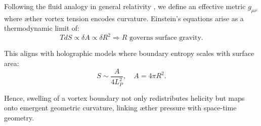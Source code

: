 Following the fluid analogy in general relativity \cite{Jacobson1995}, we define an effective metric $g_{\mu\nu}$ where æther vortex tension encodes curvature. Einstein's equations arise as a thermodynamic limit of:
\begin{equation}
    T dS \propto \delta A \propto \delta R^2 \Rightarrow R \text{ governs surface gravity}.
\end{equation}

This aligns with holographic models where boundary entropy scales with surface area:
\begin{equation}
    S \sim \frac{A}{4 L_P^2}, \quad A = 4\pi R^2.
\end{equation}

Hence, swelling of a vortex boundary not only redistributes helicity but maps onto emergent geometric curvature, linking æther pressure with space-time geometry.
